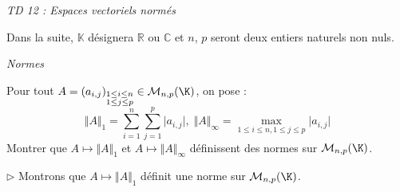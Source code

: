 \documentclass[a4paper,10pt]{report}
\begin{document}
\everymath{\displaystyle}

\begin{center}
\textit{{ {\huge TD 12 : Espaces vectoriels normés}}}
\end{center}


\bigskip

\noindent Dans la suite, $\mathbb{K}$ désignera $\mathbb{R}$ ou $\mathbb{C}$ et $n$, $p$ seront deux entiers naturels non nuls.

\medskip

\begin{center}
\textit{{ {\large Normes}}}
\end{center}

\medskip



\begin{Exa} Pour tout $A = (a_{i,j})_{\substack{1 \leq i \leq n \\ 1 \leq j \leq p}} \in \mathcal{M}_{n,p}(\K)$, on pose :
$$\Vert A \Vert_{1}  = \sum_{i = 1}^{n} \sum_{j = 1}^{p} \vert a_{i,j} \vert, \; \Vert A \Vert_{\infty}  = \max_{1 \leq i \leq n,1 \leq j \leq p} \vert a_{i,j} \vert $$
Montrer que $A \mapsto \Vert A \Vert_{1}$ et $A \mapsto \Vert A \Vert_{\infty}$ définissent des normes sur $\mathcal{M}_{n,p}(\K)$.
\end{Exa}

\corr 

\noindent $\rhd$ Montrons que $A \mapsto \Vert A \Vert_{1}$ définit une norme sur $\mathcal{M}_{n,p}(\K)$.
\end{document}
